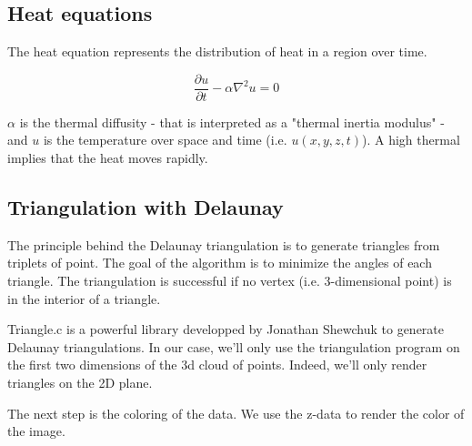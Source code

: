 \subsection{Heat equations}

The heat equation represents the distribution of heat in a region over time.

\begin{equation}\label{eqn:heateq}
\frac{\partial u}{\partial t} - \alpha \nabla^2 u = 0
\end{equation}


$\alpha$ is the thermal diffusity - that is interpreted as a "thermal inertia modulus" - and $u$ is the temperature over space and time (i.e. $u(x,y,z,t)$). A high thermal implies that the heat moves rapidly.

\subsection{Triangulation with Delaunay}

The principle behind the Delaunay triangulation is to generate triangles from triplets of point. The goal of the algorithm is to minimize the angles of each triangle. The triangulation is successful if no vertex (i.e. 3-dimensional point) is in the interior of a triangle.

Triangle.c is a powerful library developped by Jonathan Shewchuk to generate Delaunay triangulations. In our case, we'll only use the triangulation program on the first two dimensions of the 3d cloud of points. Indeed, we'll only render triangles on the 2D plane.

The next step is the coloring of the data. We use the z-data to render the color of the image. 